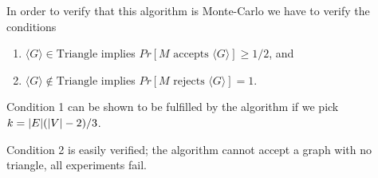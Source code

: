 \documentclass[a4paper,blends,pdf,colorBG,slideColor]{prosper}
\begin{document}
In order to verify that this algorithm is Monte-Carlo we have to verify the conditions
\begin{enumerate}
\item $\langle G \rangle \in \text{Triangle}$ implies $Pr[\text{$M$ accepts $\langle G \rangle$}] \ge 1/2$, and
\item $\langle G \rangle \not\in \text{Triangle}$ implies $Pr[\text{$M$ rejects $\langle G \rangle$}] = 1$.
\end{enumerate}

Condition 1 can be shown to be fulfilled by the algorithm if we pick $k = {|{E}|}({|{V}|} - 2)/3$.

Condition 2 is easily verified; the algorithm cannot accept a graph with no triangle, all experiments fail.

\es
\end{document}
